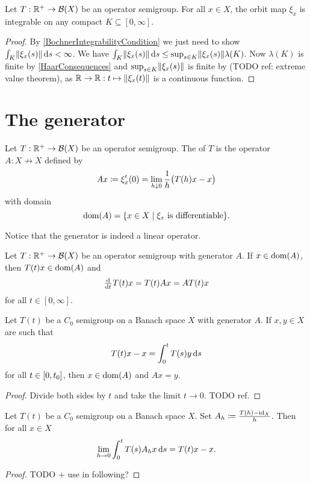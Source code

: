 \begin{lemma} \label{integrabilityOrbitMaps}
Let $T: \mathbb{R}^+\to \operatorname{\mathcal{B}}(X)$ be an operator semigroup. For all $x\in X$, the orbit map $\xi_x$ is integrable on any compact $K\subseteq [0,\infty]$.
\end{lemma}
\begin{proof}
By \ref{BochnerIntegrabilityCondition} we just need to show $\int_K\lVert\xi_x(s)\rVert\operatorname{d \!}{s} < \infty$. We have $\int_K\lVert\xi_x(s)\rVert\operatorname{d \!}{s} \leq \sup_{s\in K}\lVert\xi_x(s)\rVert\lambda(K)$. Now $\lambda(K)$ is finite by \ref{HaarConsequences} and $\sup_{s\in K}\lVert\xi_x(s)\rVert$ is finite by (TODO ref: extreme value theorem), as $\mathbb{R} \to \mathbb{R}: t\mapsto \lVert\xi_x(t)\rVert$ is a continuous function.
\end{proof}

\section{The generator}
\begin{definition}
Let $T: \mathbb{R}^+\to \operatorname{\mathcal{B}}(X)$ be an operator semigroup. The  of $T$ is the operator $A: X\not\to X$ defined by
\[ Ax \coloneqq \xi_x'(0) = \lim_{h\downarrow 0}\frac{1}{h}\big(T(h)x - x\big) \]
with domain
\[ \dom(A) = \setbuilder{x\in X}{\text{$\xi_x$ is differentiable}}. \]
\end{definition}
Notice that the generator is indeed a linear operator.

\begin{lemma} \label{differentialOperatorSemigroupGenerator}
Let $T: \mathbb{R}^+\to \operatorname{\mathcal{B}}(X)$ be an operator semigroup with generator $A$. If $x\in\operatorname{dom}(A)$, then $T(t)x\in\operatorname{dom}(A)$ and
\[ \od{}{t}T(t)x = T(t)Ax = AT(t)x \]
for all $t\in [0,\infty]$.
\end{lemma}

\begin{lemma} \label{domainGeneratorLemma}
Let $T(t)$ be a $C_0$ semigroup on a Banach space $X$ with generator $A$. If $x,y\in X$ are such that
\[ T(t)x-x = \int_0^tT(s)y\operatorname{d \!}{s} \]
for all $t\in\interval{0,t_0}$, then $x\in\operatorname{dom}(A)$ and $Ax = y$.
\end{lemma}
\begin{proof}
Divide both sides by $t$ and take the limit $t\to 0$. TODO ref.
\end{proof}

\begin{lemma} \label{convergenceGeneratorUnderIntegral}
Let $T(t)$ be a $C_0$ semigroup on a Banach space $X$. Set $A_h \coloneqq \frac{T(h) - \operatorname{id}_X}{h}$. Then for all $x\in X$
\[ \lim_{h\to 0}\int_0^t T(s)A_hx\operatorname{d \!}{s} = T(t)x-x. \]
\end{lemma}
\begin{proof}
TODO + use in following?
\end{proof}

